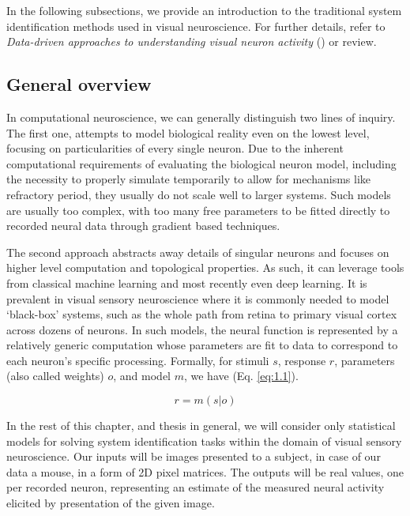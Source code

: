 In the following subsections, we provide an introduction to the traditional system identification methods used in visual neuroscience. For further details, refer to \textit{Data-driven approaches to understanding visual neuron activity} (\citep{doi:10.1146/annurev-vision-091718-014731}) or \cite{Carandini10577} review.

\subsection{General overview}

In computational neuroscience, we can generally distinguish two lines of inquiry. The first one, attempts to model biological reality even on the lowest level, focusing on particularities of every single neuron. Due to the inherent computational requirements of evaluating the biological neuron model, including the necessity to properly simulate temporarily to allow for mechanisms like refractory period, they usually do not scale well to larger systems. Such models are usually too complex, with too many free parameters to be fitted directly to recorded neural data through gradient based techniques. 

The second approach abstracts away details of singular neurons and focuses on higher level computation and topological properties. As such, it can leverage tools from classical machine learning and most recently even deep learning. It is prevalent in visual sensory neuroscience where it is commonly needed to model ‘black-box’ systems, such as the whole path from retina to primary visual cortex across dozens of neurons. In such models, the neural function is represented by a relatively generic computation whose parameters are fit to data to correspond to each neuron’s specific processing. Formally, for stimuli $s$, response $r$, parameters (also called weights) $o$, and model $m$, we have (Eq. \ref{eq:1.1}).

\begin{equation}\label{eq:1.1}
    r=m(s|o)
\end{equation}

In the rest of this chapter, and thesis in general, we will consider only statistical models for solving system identification tasks within the domain of visual sensory neuroscience. Our inputs will be images presented to a subject, in case of our data a mouse, in a form of 2D pixel matrices. The outputs will be real values, one per recorded neuron, representing an estimate of the measured neural activity elicited by presentation of the given image.


